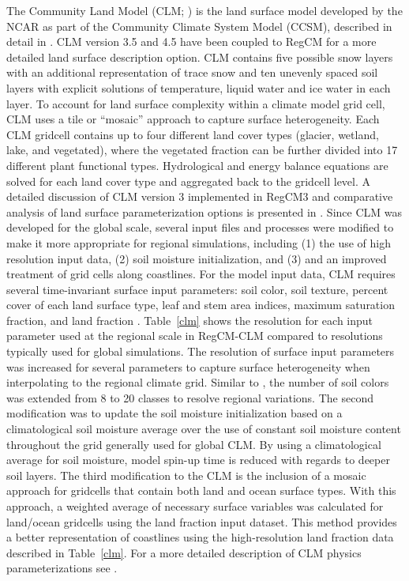  The Community Land Model (CLM; \cite{Oleson_08})
is the land surface model developed by the \ac{NCAR}
as part of the Community Climate System Model (CCSM), described
in detail in \cite{Collins_06}.  CLM version 3.5 and 4.5 have been coupled to
\ac{RegCM} for a more
detailed land surface description option. CLM contains five possible snow
layers with an additional representation of trace snow and ten unevenly spaced
soil layers with explicit solutions of temperature, liquid water and ice water
in each layer.  To account for land surface complexity within a climate model
grid cell, CLM uses a tile or “mosaic” approach to capture surface
heterogeneity.  Each CLM gridcell contains up to four different land cover types
(glacier, wetland, lake, and vegetated), where the vegetated fraction can be
further divided into 17 different plant functional types.  Hydrological and
energy balance equations are solved for each land cover type and aggregated back
to the gridcell level.  A detailed discussion of CLM version 3 implemented in
RegCM3 and comparative analysis of land surface parameterization options is
presented in \cite{Steiner_09}.  Since CLM was developed for the global scale,
several input files and processes were modified to make it more appropriate for
regional simulations, including (1) the use of high resolution input data, (2)
soil moisture initialization, and (3) and an improved treatment of grid cells
along coastlines.  For the model input data, CLM requires several time-invariant
surface input parameters:  soil color, soil texture, percent cover of each land
surface type, leaf and stem area indices, maximum saturation fraction, and land
fraction \citep{Lawrence_07}.  Table~\ref{clm} shows the resolution for each
input parameter used at the regional scale in RegCM-CLM compared to resolutions
typically used for global simulations.  The resolution of surface input
parameters was increased for several parameters to capture surface heterogeneity
when interpolating to the regional climate grid.  Similar to \cite{Lawrence_07},
the number of soil colors was extended from 8 to 20 classes to resolve regional
variations.  The second modification was to update the soil moisture
initialization based on a climatological soil moisture average
\citep{Giorgi_89b} over the use of constant soil moisture content throughout the
grid generally used for global CLM.  By using a climatological average for soil
moisture, model spin-up time is reduced with regards to deeper soil layers.  The
third modification to the CLM is the inclusion of a mosaic approach for
gridcells that contain both land and ocean surface types.  With this approach, a
weighted average of necessary surface variables was calculated for land/ocean
gridcells using the land fraction input dataset.  This method provides a better
representation of coastlines using the high-resolution land fraction data
described in Table~\ref{clm}.  For a more detailed description of CLM physics
parameterizations see \cite{Oleson_04}.


